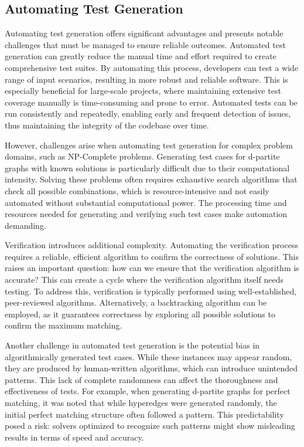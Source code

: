 \subsection{Automating Test Generation}
Automating test generation offers significant advantages and presents notable challenges that must be managed to ensure reliable outcomes. Automated test generation can greatly reduce the manual time and effort required to create comprehensive test suites. By automating this process, developers can test a wide range of input scenarios, resulting in more robust and reliable software. This is especially beneficial for large-scale projects, where maintaining extensive test coverage manually is time-consuming and prone to error. Automated tests can be run consistently and repeatedly, enabling early and frequent detection of issues, thus maintaining the integrity of the codebase over time.

However, challenges arise when automating test generation for complex problem domains, such as NP-Complete problems. Generating test cases for d-partite graphs with known solutions is particularly difficult due to their computational intensity. Solving these problems often requires exhaustive search algorithms that check all possible combinations, which is resource-intensive and not easily automated without substantial computational power. The processing time and resources needed for generating and verifying such test cases make automation demanding.

Verification introduces additional complexity. Automating the verification process requires a reliable, efficient algorithm to confirm the correctness of solutions. This raises an important question: how can we ensure that the verification algorithm is accurate? This can create a cycle where the verification algorithm itself needs testing. To address this, verification is typically performed using well-established, peer-reviewed algorithms. Alternatively, a backtracking algorithm can be employed, as it guarantees correctness by exploring all possible solutions to confirm the maximum matching.

Another challenge in automated test generation is the potential bias in algorithmically generated test cases. While these instances may appear random, they are produced by human-written algorithms, which can introduce unintended patterns. This lack of complete randomness can affect the thoroughness and effectiveness of tests. For example, when generating d-partite graphs for perfect matching, it was noted that while hyperedges were generated randomly, the initial perfect matching structure often followed a pattern. This predictability posed a risk: solvers optimized to recognize such patterns might show misleading results in terms of speed and accuracy.

